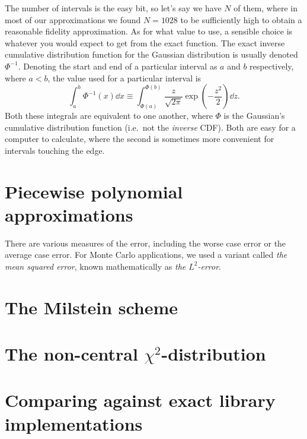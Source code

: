 \documentclass[11pt,a4paper,oneside,english]{extarticle}
\begin{document}
The number of intervals is the easy bit, so let's say we have $ N $ of them, where in most of our approximations we found $ N = 1028 $ to be sufficiently high to obtain a reasonable fidelity approximation. As for what value to use, a sensible choice is whatever you would expect to get from the exact function. The exact inverse cumulative distribution function for the Gaussian distribution is usually denoted $ \Phi^{-1} $. Denoting the start and end of a particular interval as $ a $ and $ b $ respectively, where $ a < b $, the value used for a particular interval is
\begin{equation}
\int_a^b \Phi^{-1}(x) \dd{x} \equiv \int_{\Phi(a)}^{\Phi(b)} \dfrac{z}{\sqrt{2\pi}} \exp(-\dfrac{z^2}{2}) \dd{z}.
\end{equation}
Both these integrals are equivalent to one another, where $ \Phi $ is the Gaussian's cumulative distribution function (i.e.~not the \emph{inverse} CDF). Both are easy for a computer to calculate, where the second is sometimes more convenient for intervals touching the edge. 

\section{Piecewise polynomial approximations}

There are various measures of the error, including the worse case error or the average case error. 
For Monte Carlo applications, we used a variant called \emph{the mean squared error}, known mathematically as \emph{the $ L^2 $-error}.

\section{The Milstein scheme}

\section{The non-central $ \chi^2 $-distribution}

\section{Comparing against exact library implementations}
\end{document}
